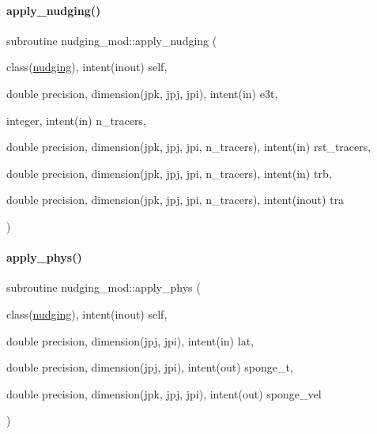 \paragraph{\texorpdfstring{apply\+\_\+nudging()}{apply\_nudging()}}
{\footnotesize\ttfamily subroutine nudging\+\_\+mod\+::apply\+\_\+nudging (\begin{DoxyParamCaption}\item[{class(\mbox{\hyperlink{structnudging__mod_1_1nudging}{nudging}}), intent(inout)}]{self,  }\item[{double precision, dimension(jpk, jpj, jpi), intent(in)}]{e3t,  }\item[{integer, intent(in)}]{n\+\_\+tracers,  }\item[{double precision, dimension(jpk, jpj, jpi, n\+\_\+tracers), intent(in)}]{rst\+\_\+tracers,  }\item[{double precision, dimension(jpk, jpj, jpi, n\+\_\+tracers), intent(in)}]{trb,  }\item[{double precision, dimension(jpk, jpj, jpi, n\+\_\+tracers), intent(inout)}]{tra }\end{DoxyParamCaption})}

\mbox{\label{namespacenudging__mod_abf742a7b870eba708b8575f2e2df8159}} 
\paragraph{\texorpdfstring{apply\+\_\+phys()}{apply\_phys()}}
{\footnotesize\ttfamily subroutine nudging\+\_\+mod\+::apply\+\_\+phys (\begin{DoxyParamCaption}\item[{class(\mbox{\hyperlink{structnudging__mod_1_1nudging}{nudging}}), intent(inout)}]{self,  }\item[{double precision, dimension(jpj, jpi), intent(in)}]{lat,  }\item[{double precision, dimension(jpj, jpi), intent(out)}]{sponge\+\_\+t,  }\item[{double precision, dimension(jpk, jpj, jpi), intent(out)}]{sponge\+\_\+vel }\end{DoxyParamCaption})}

\mbox{\label{namespacenudging__mod_a9c5140991fb8e1f77cd3c13a5f2afbeb}} 
